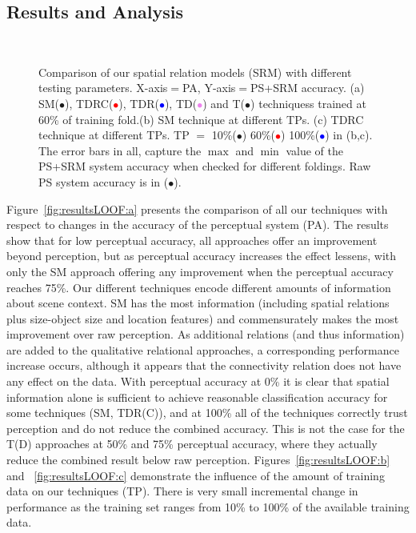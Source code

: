 \documentclass[letterpaper]{article}
\begin{document}
\subsection{Results and Analysis}
\label{sec:Analysis}

\begin{figure}[t]
\begin{center}
\\
\quad
{}
\caption{Comparison of our spatial relation models (SRM) with different testing parameters. X-axis$=$PA, Y-axis$=$PS+SRM accuracy. (a) SM(\textcolor{OliveGreen}{\textbf{$\bullet$}}), TDRC(\textcolor{Red}{\textbf{$\bullet$}}), TDR(\textcolor{blue}{\textbf{$\bullet$}}), TD(\textcolor{Violet}{\textbf{$\bullet$}}) and T(\textcolor{Sepia}{\textbf{$\bullet$}}) techniquess trained at 60\% of training fold.(b) SM technique at different TPs. (c) TDRC technique at different TPs. TP $=$ 10\%(\textcolor{OliveGreen}{\textbf{$\bullet$}}) 60\%(\textcolor{red}{\textbf{$\bullet$}}) 100\%(\textcolor{blue}{\textbf{$\bullet$}}) in (b,c). The error bars in all, capture the $\max$ and $\min$ value of the PS+SRM system accuracy when checked for different foldings. Raw PS system accuracy is in ({$\bullet$}).}

\label{fig:resultsLOOF}

\end{center}
\end{figure}

Figure~\ref{fig:resultsLOOF:a} presents the comparison of all our techniques with respect to changes in the accuracy of the perceptual system (PA). The results show that for low perceptual accuracy, all approaches offer an improvement beyond perception, but as perceptual accuracy increases the effect lessens, with only the SM approach offering any improvement when the perceptual accuracy reaches 75\%. Our different techniques encode different amounts of information about scene context. SM has the most information (including spatial relations plus size-object size and location features) and commensurately makes the most improvement over raw perception. As additional relations (and thus information) are added to the qualitative relational approaches, a corresponding performance increase occurs, although it appears that the connectivity relation does not have any effect on the data. With perceptual accuracy at 0\% it is clear that spatial information alone is sufficient to achieve reasonable classification accuracy for some techniques (SM, TDR(C)), and at 100\% all of the techniques correctly trust perception and do not reduce the combined accuracy. This is not the case for the T(D) approaches at 50\% and 75\% perceptual accuracy, where they actually reduce the combined result below raw perception.  Figures~\ref{fig:resultsLOOF:b} and ~\ref{fig:resultsLOOF:c} demonstrate the influence of the amount of training data on our techniques (TP). There is very small incremental change in performance as the training set ranges from 10\% to 100\% of the available training data.
\end{document}
